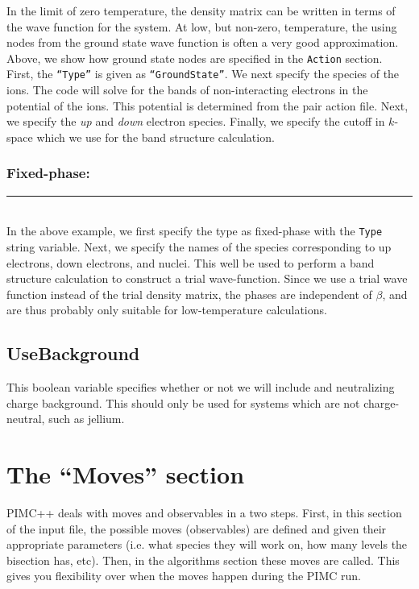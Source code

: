 \documentclass{book}
\begin{document}
In the limit of zero temperature, the density matrix can be written in
terms of the wave function for the system.  At low, but non-zero,
temperature, the using nodes from the ground state wave function is
often a very good approximation.  Above, we show how ground state
nodes are specified in the \texttt{Action} section.  First, the
\texttt{``Type''} is given as \texttt{``GroundState''}.  We next
specify the species of the ions.  The code will solve for the bands of
non-interacting electrons in the potential of the ions.  This
potential is determined from the pair action file.  Next, we specify
the {\em up} and {\em down} electron species.  Finally, we specify the
cutoff in $k$-space which we use for the band structure calculation.

\subsubsection{Fixed-phase:}
\rule{0.0cm}{0.75cm}\rule{0.6cm}{0cm}\\
In the above example, we first specify the type as fixed-phase with
the \texttt{Type} string variable.  Next, we specify the names of the
species corresponding to up electrons, down electrons, and nuclei.
This well be used to perform a band structure calculation to construct
a trial wave-function.  Since we use a trial wave function instead of
the trial density matrix, the phases are independent of $\beta$, and
are thus probably only suitable for low-temperature calculations.

\subsection{UseBackground}
This boolean variable specifies whether or not we will include and
neutralizing charge background.  This should only be used for systems
which are not charge-neutral, such as jellium.

\section{The ``Moves'' section}
PIMC++ deals with moves and observables in a two steps. First, in this
section of the input file, the possible moves (observables) are
defined and given their appropriate parameters (i.e. what species they
will work on, how many levels the bisection has, etc).  Then, in the
algorithms section these moves are called.  This gives you flexibility
over when the moves happen during the PIMC run.  
\end{document}

